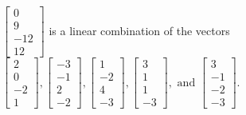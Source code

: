 \begin{exercise}
\begin{exerciseStatement}
  \end{exerciseStatement}
  \begin{exerciseAnswer}
   \(\left[\begin{array}{c}
0 \\
9 \\
-12 \\
12
\end{array}\right]\) 
  	 is  
	a linear combination of the vectors \(\left[\begin{array}{c}
2 \\
0 \\
-2 \\
1
\end{array}\right] , \left[\begin{array}{c}
-3 \\
-1 \\
2 \\
-2
\end{array}\right] , \left[\begin{array}{c}
1 \\
-2 \\
4 \\
-3
\end{array}\right] , \left[\begin{array}{c}
3 \\
1 \\
1 \\
-3
\end{array}\right] , \text{ and } \left[\begin{array}{c}
3 \\
-1 \\
-2 \\
-3
\end{array}\right]\).

	
  


  \end{exerciseAnswer}
\end{exercise}